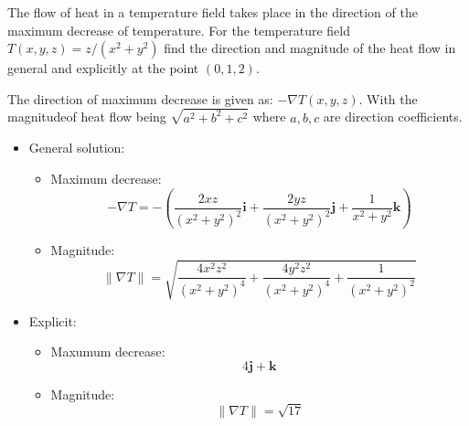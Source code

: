 The flow of heat in a temperature field takes place in the direction of the maximum decrease of temperature. For the temperature field $T\left(x,y,z\right)=z/\left(x^2+y^2\right)$ find the direction and magnitude of the heat flow in general and explicitly at the point $\left(0,1,2\right)$.

The direction of maximum decrease is given as: $-\nabla T\left(x,y,z\right)$. With the magnitudeof heat flow being $\sqrt{a^2+b^2+c^2}$ where $a,b,c$ are direction coefficients.
\begin{itemize}
	\item General solution:
		\begin{itemize}
			\item Maximum decrease:
				\begin{equation*}
					\boxed{
					-\nabla T= -\left(\frac{2xz}{\left(x^2+y^2\right)^2}\boldsymbol{i}+\frac{2yz}{\left(x^2+y^2\right)^2}\boldsymbol{j}+\frac{1}{x^2+y^2}\boldsymbol{k}\right)
					}
				\end{equation*}
			\item Magnitude:
				\begin{equation*}
					\boxed{
					\|\nabla T\|=\sqrt{\frac{4x^2z^2}{\left(x^2+y^2\right)^4}+\frac{4y^2z^2}{\left(x^2+y^2\right)^4}+\frac{1}{\left(x^2+y^2\right)^2}}
					}
				\end{equation*}
		\end{itemize}
	\item Explicit:
		\begin{itemize}
			\item Maxumum decrease:
				\begin{equation*}
					\boxed{
					4\boldsymbol{j}+\boldsymbol{k}
					}
				\end{equation*}
			\item Magnitude:
				\begin{equation*}
				\boxed{
					\|\nabla T \| = \sqrt{17}
					}
					\end{equation*}
	\end{itemize}
\end{itemize}
